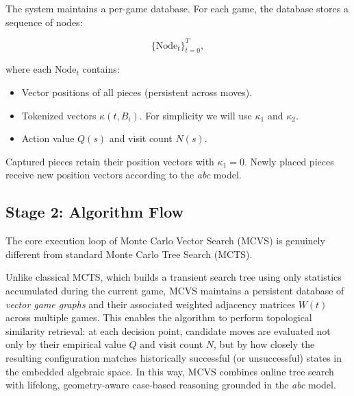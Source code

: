 \documentclass[11pt,a4paper]{article}
\theoremstyle{plain}
\theoremstyle{definition}
\begin{document}
\vspace{0.5em}

The system maintains a per-game database. For each game, the database stores a sequence of nodes:

\vspace{0.5em}

\[
\{\text{Node}_t\}_{t=0}^{T},
\]

\vspace{0.5em}

where each \(\text{Node}_t\) contains:

\vspace{0.5em}

\begin{itemize}
    \item Vector positions of all pieces (persistent across moves).
    \item Tokenized vectors \(\kappa(t, B_i)\). For simplicity we will use $\kappa_1$ and $\kappa_2$.
    \item Action value \(Q(s)\) and visit count \(N(s)\).
\end{itemize}

\vspace{0.5em}

Captured pieces retain their position vectors with \(\kappa_1 = 0\). Newly placed pieces receive new position vectors according to the \emph{abc} model.

\vspace{0.5em}

\subsection{Stage 2: Algorithm Flow}

\vspace{0.5em}

The core execution loop of Monte Carlo Vector Search (MCVS) is genuinely different from standard Monte Carlo Tree Search (MCTS). 

\vspace{0.5em}

Unlike classical MCTS, which builds a transient search tree using only statistics accumulated during the current game, MCVS maintains a persistent database of \emph{vector game graphs} and their associated weighted adjacency matrices $W(t)$ across multiple games. This enables the algorithm to perform topological similarity retrieval: at each decision point, candidate moves are evaluated not only by their empirical value $Q$ and visit count $N$, but by how closely the resulting configuration matches historically successful (or unsuccessful) states in the embedded algebraic space. In this way, MCVS combines online tree search with lifelong, geometry-aware case-based reasoning grounded in the \emph{abc} model.
\end{document}
